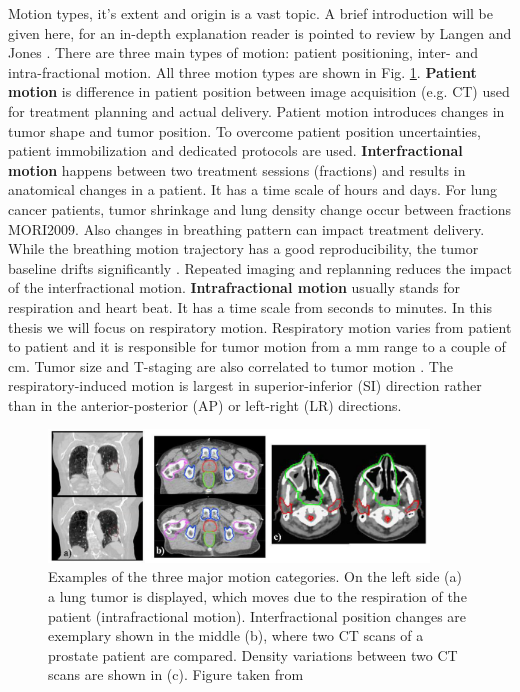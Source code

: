 \documentclass[type=dr, dr=rernat, accentcolor=tud7b,colorbacktitle, bigchapter, openright, twoside, 12pt ]{tudthesis}
\begin{document}
Motion types, it's extent and origin is a vast topic. A brief introduction will be given here, for an in-depth explanation reader is pointed to review by Langen and Jones \cite{Langen2001}.
There are three main types of motion: patient positioning, inter- and intra-fractional motion. All three motion types are shown in Fig. \ref{motion}.
\newline
\textbf{Patient motion} is difference in patient position between image acquisition (e.g. CT) used for treatment planning and actual delivery. Patient motion introduces changes in tumor shape and tumor position. To overcome patient 
position uncertainties, patient immobilization and dedicated protocols are used.
\newline
\textbf{Interfractional motion} happens between two treatment sessions (fractions) and results in anatomical changes in a patient. It has a time scale of hours and days. For lung cancer patients, tumor shrinkage and lung density change occur between fractions MORI2009. 
Also changes in breathing pattern can impact treatment delivery. While the breathing motion trajectory has a good reproducibility, the tumor baseline drifts significantly \cite{Sonke2008}. Repeated imaging and replanning reduces the impact of the interfractional motion.
\newline
\textbf{Intrafractional motion} usually stands for respiration and heart beat. It has a time scale from seconds to minutes. In this thesis we will focus on respiratory motion. Respiratory motion varies from patient to patient and 
it is responsible for tumor motion from a mm range to a couple of cm. Tumor size and T-staging are also correlated to tumor motion \cite{Liu2007}. The respiratory-induced motion is largest in superior-inferior (SI) direction rather than 
in the anterior-posterior (AP) or left-right (LR) directions.


\begin{figure}[H]
\begin{center}
\includegraphics[width=0.9\textwidth]{./Images/motion_examples.png}
\caption{Examples of the three major motion categories. On the left side (a) a lung tumor is displayed, which moves due to the respiration 
of the patient (intrafractional motion). Interfractional position changes are exemplary shown in the middle (b), where two CT scans of a 
prostate patient are compared. Density variations between two CT scans are shown in (c). Figure taken from \cite{Eng11}}
\label{motion}
\end{center}
\end{figure}
\end{document}
